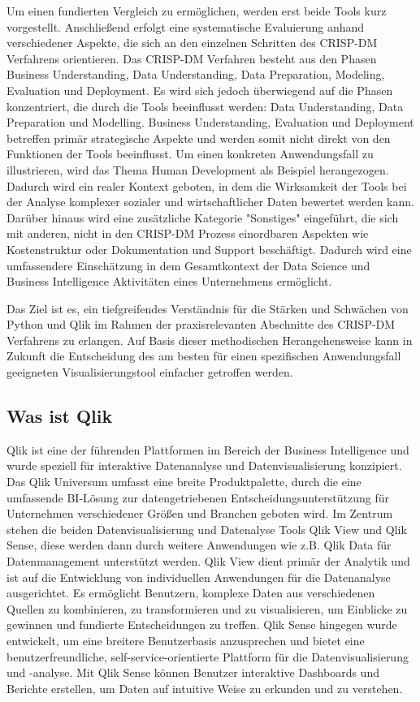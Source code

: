 \documentclass[12pt]{article}
\begin{document}
	Um einen fundierten Vergleich zu ermöglichen, werden erst beide Tools kurz vorgestellt. Anschließend erfolgt eine systematische Evaluierung anhand verschiedener Aspekte, die sich an den einzelnen Schritten des CRISP-DM Verfahrens orientieren. Das CRISP-DM Verfahren besteht aus den Phasen Business Understanding, Data Understanding, Data Preparation, Modeling, Evaluation und Deployment. Es wird sich jedoch überwiegend auf die Phasen konzentriert, die durch die Tools beeinflusst werden: Data Understanding, Data Preparation und Modelling. Business Understanding, Evaluation und Deployment betreffen primär strategische Aspekte und werden somit nicht direkt von den Funktionen der Tools beeinflusst. Um einen konkreten Anwendungsfall zu illustrieren, wird das Thema Human Development als Beispiel herangezogen. Dadurch wird ein realer Kontext geboten, in dem die Wirksamkeit der Tools bei der Analyse komplexer sozialer und wirtschaftlicher Daten bewertet werden kann. Darüber hinaus wird eine zusätzliche Kategorie "Sonstiges" eingeführt, die sich mit anderen, nicht in den CRISP-DM Prozess einordbaren Aspekten wie Kostenstruktur oder Dokumentation und Support beschäftigt. Dadurch wird eine umfassendere Einschätzung in dem Gesamtkontext der Data Science und Business Intelligence Aktivitäten eines Unternehmens ermöglicht.
	
	Das Ziel ist es, ein tiefgreifendes Verständnis für die Stärken und Schwächen von Python und Qlik im Rahmen der praxisrelevanten Abschnitte des CRISP-DM Verfahrens zu erlangen. Auf Basis dieser methodischen Herangehensweise kann in Zukunft die Entscheidung des am besten für einen spezifischen Anwendungsfall geeigneten Visualisierungstool einfacher getroffen werden.
	
	\subsection{Was ist Qlik}
	Qlik ist eine der führenden Plattformen im Bereich der Business Intelligence und wurde speziell für interaktive Datenanalyse und Datenvisualisierung konzipiert. Das Qlik Universum umfasst eine breite Produktpalette, durch die eine umfassende BI-Lösung zur datengetriebenen Entscheidungsunterstützung für Unternehmen verschiedener Größen und Branchen geboten wird. Im Zentrum stehen die beiden Datenvisualisierung und Datenalyse Tools Qlik View und Qlik Sense, diese werden dann durch weitere Anwendungen wie z.B. Qlik Data für Datenmanagement unterstützt werden. Qlik View dient primär der Analytik und ist auf die Entwicklung von individuellen Anwendungen für die Datenanalyse ausgerichtet. Es ermöglicht Benutzern, komplexe Daten aus verschiedenen Quellen zu kombinieren, zu transformieren und zu visualisieren, um Einblicke zu gewinnen und fundierte Entscheidungen zu treffen. Qlik Sense hingegen wurde entwickelt, um eine breitere Benutzerbasis anzusprechen und bietet eine benutzerfreundliche, self-service-orientierte Plattform für die Datenvisualisierung und -analyse. Mit Qlik Sense können Benutzer interaktive Dashboards und Berichte erstellen, um Daten auf intuitive Weise zu erkunden und zu verstehen.
	
\end{document}
